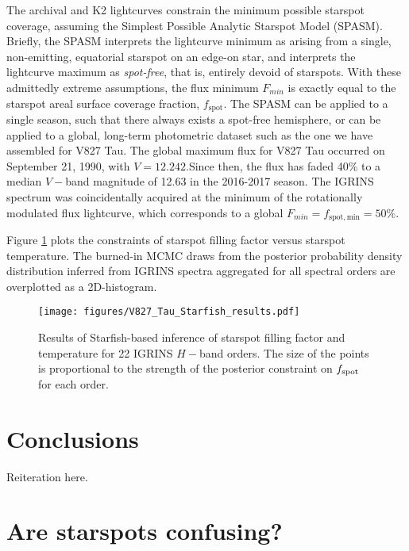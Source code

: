 \documentclass[twocolumn]{emulateapj}%
\begin{document}
The archival and K2 lightcurves constrain the minimum possible starspot coverage, assuming the Simplest Possible Analytic Starspot Model (SPASM).  Briefly, the SPASM interprets the lightcurve minimum as arising from a single, non-emitting, equatorial starspot on an edge-on star, and interprets the lightcurve maximum as \emph{spot-free}, that is, entirely devoid of starspots.  With these admittedly extreme assumptions, the flux minimum $F_{min}$ is exactly equal to the starspot areal surface coverage fraction, $f_{\mathrm{spot}}$.  The SPASM can be applied to a single season, such that there always exists a spot-free hemisphere, or can be applied to a global, long-term photometric dataset such as the one we have assembled for V827 Tau.  The global maximum flux for V827 Tau occurred on September 21, 1990, with $V=12.242$.Since then, the flux has faded 40\% to a median $V-$band magnitude of 12.63 in the 2016-2017 season.  The IGRINS spectrum was coincidentally acquired at the minimum of the rotationally modulated flux lightcurve, which corresponds to a global $F_{min} = f_{\mathrm{spot, min}} = 50\%$.

Figure \ref{} plots the constraints of starspot filling factor versus starspot temperature.  The burned-in MCMC draws from the posterior probability density distribution inferred from IGRINS spectra aggregated for all spectral orders are overplotted as a 2D-histogram.

 \begin{figure*}
 \centering
 \texttt{[image: figures/V827\_Tau\_Starfish\_results.pdf]}
 \caption{Results of Starfish-based inference of starspot filling factor and temperature for 22 IGRINS $H-$band orders.  The size of the points is proportional to the strength of the posterior constraint on $f_{\rm spot}$ for each order.}
 \label{fig:V827TauStarfish}
\end{figure*}

\section{Conclusions}

Reiteration here.

\clearpage
\pagebreak


\appendix

\section{Are starspots confusing?}
\label{methods-details}
\end{document}
